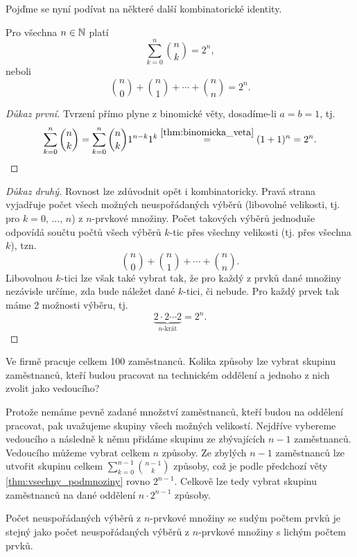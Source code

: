 Pojďme se nyní podívat na některé další kombinatorické identity.
\begin{theorem}\label{thm:vsechny_podmnoziny}
    Pro všechna $n\in\mathbb{N}$ platí
    \[\sum_{k=0}^{n}\binom{n}{k}=2^n,\]
    neboli
    \[\binom{n}{0}+\binom{n}{1}+\cdots+\binom{n}{n}=2^n.\]
\end{theorem}
\begin{proof}[Důkaz první]
    Tvrzení přímo plyne z binomické věty, dosadíme-li $a=b=1$, tj.
    \[\sum_{k=0}^{n}\binom{n}{k}=\sum_{k=0}^{n}\binom{n}{k}1^{n-k}1^k\stackrel{\ref{thm:binomicka_veta}}{=}(1+1)^n=2^n.\]
\end{proof}
\begin{proof}[Důkaz druhý]
    Rovnost lze zdůvodnit opět i kombinatoricky. Pravá strana vyjadřuje počet všech možných neuspořádaných výběrů (libovolné velikosti, tj. pro $k=0,\,\dots,\,n$) z $n$-prvkové množiny. Počet takových výběrů jednoduše odpovídá součtu počtů všech výběrů $k$-tic přes všechny velikosti (tj. přes všechna $k$), tzn.
    \[\binom{n}{0}+\binom{n}{1}+\cdots+\binom{n}{n}.\]
    Libovolnou $k$-tici lze však také vybrat tak, že pro každý z prvků dané množiny nezávisle určíme, zda bude náležet dané $k$-tici, či nebude. Pro každý prvek tak máme 2 možnosti výběru, tj.
    \[\underbrace{2\cdot 2\cdots 2}_{n\text{-krát}}=2^n.\]
\end{proof}
\begin{task}
    Ve firmě pracuje celkem 100 zaměstnanců. Kolika způsoby lze vybrat skupinu zaměstnanců, kteří budou pracovat na technickém oddělení a jednoho z nich zvolit jako vedoucího?
\end{task}
\begin{solution}
    Protože nemáme pevně zadané množství zaměstnanců, kteří budou na oddělení pracovat, pak uvažujeme skupiny všech možných velikostí. Nejdříve vybereme vedoucího a následně k němu přidáme skupinu ze zbývajících $n-1$ zaměstnanců. Vedoucího můžeme vybrat celkem $n$ způsoby. Ze zbylých $n-1$ zaměstnanců lze utvořit skupinu celkem $\sum_{k=0}^{n-1}\binom{n-1}{k}$ způsoby, což je podle předchozí věty \ref{thm:vsechny_podmnoziny} rovno $2^{n-1}$. Celkově lze tedy vybrat skupinu zaměstnanců na dané oddělení $n\cdot 2^{n-1}$ způsoby.
\end{solution}
\begin{theorem}
    Počet neuspořádaných výběrů z $n$-prvkové množiny se sudým počtem prvků je stejný jako počet neuspořádaných výběrů z $n$-prvkové množiny s lichým počtem prvků.
\end{theorem}
